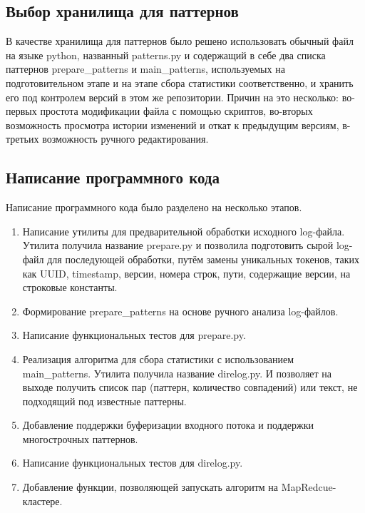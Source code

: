 \subsection{Выбор хранилища для паттернов}
В качестве хранилища для паттернов было решено использовать обычный файл на
языке python, названный patterns.py и содержащий в себе два списка паттернов
prepare\_patterns и main\_patterns, используемых на подготовительном этапе
и на этапе сбора статистики соответственно,
и хранить его под контролем версий в этом же репозитории. Причин
на это несколько: во-первых простота модификации файла с помощью скриптов,
во-вторых возможность просмотра истории изменений и откат к предыдущим версиям,
в-третьих возможность ручного редактирования.

\subsection{Написание программного кода}

Написание программного кода было разделено на несколько этапов.
\begin{enumerate}
\item Написание утилиты для предварительной обработки исходного log-файла.
  Утилита получила название prepare.py и позволила подготовить сырой log-файл
  для последующей обработки, путём замены уникальных токенов, таких
  как UUID, timestamp, версии, номера строк, пути, содержащие версии, на
  строковые константы.
\item Формирование prepare\_patterns на основе ручного анализа
  log-файлов.
\item Написание функциональных тестов для prepare.py.
\item Реализация алгоритма для сбора статистики с использованием
  main\_patterns. Утилита получила название direlog.py. И позволяет на
  выходе получить список пар (паттерн, количество совпадений) или текст,
  не подходящий под известные паттерны.
\item Добавление поддержки буферизации входного потока и поддержки
  многострочных паттернов.
\item Написание функциональных тестов для direlog.py.
\item Добавление функции, позволяющей запускать алгоритм на MapRedcue-кластере.
\end{enumerate}

